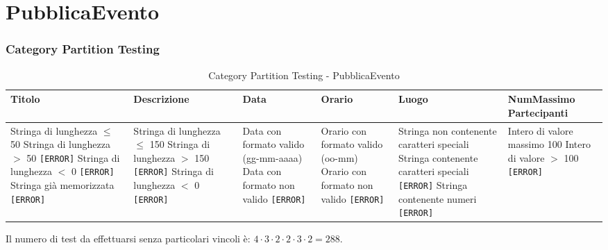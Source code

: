 \section{PubblicaEvento}
\subsubsection*{Category Partition Testing}
\begin{table}[H]
	\centering
	\footnotesize
	\renewcommand{\arraystretch}{1.3}
	\begin{tabular}{|p{2.5cm}|p{2.5cm}|p{2.5cm}|p{2.5cm}|p{2.5cm}|p{2.5cm}|}
		\hline
		\textbf{Titolo} & \textbf{Descrizione} & \textbf{Data} & \textbf{Orario} & \textbf{Luogo} & \textbf{NumMassimo Partecipanti} \\
		\hline
		Stringa di lunghezza $\leq$ 50 \newline
		Stringa di lunghezza $>$ 50 \texttt{[ERROR]} \newline
		Stringa di lunghezza $<$ 0 \texttt{[ERROR]} \newline
		Stringa già memorizzata \texttt{[ERROR]} &

		Stringa di lunghezza $\leq$ 150 \newline
		Stringa di lunghezza $>$ 150 \texttt{[ERROR]} \newline
		Stringa di lunghezza $<$ 0 \texttt{[ERROR]} &

		Data con formato valido (gg-mm-aaaa) \newline
		Data con formato non valido \texttt{[ERROR]} &

		Orario con formato valido (oo-mm) \newline
		Orario con formato non valido \texttt{[ERROR]} &

		Stringa non contenente caratteri speciali \newline
		Stringa contenente caratteri speciali \texttt{[ERROR]} \newline
		Stringa contenente numeri \texttt{[ERROR]} &

		Intero di valore massimo 100 \newline
		Intero di valore $>$ 100 \texttt{[ERROR]} \\
		\hline
	\end{tabular}
	\caption{Category Partition Testing - PubblicaEvento}
\end{table}

\noindent Il numero di test da effettuarsi senza particolari vincoli è: $4 \cdot 3 \cdot 2 \cdot 2 \cdot 3 \cdot 2 = 288$.

